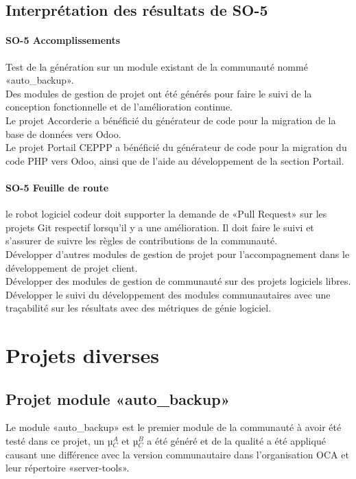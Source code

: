 \subsection{Interprétation des résultats de SO-5}

\paragraph{SO-5 Accomplissements}
Test de la génération sur un module existant de la communauté nommé «auto\_backup».\\
Des modules de gestion de projet ont été générés pour faire le suivi de la conception fonctionnelle et de l’amélioration continue.\\
Le projet Accorderie a bénéficié du générateur de code pour la migration de la base de données vers Odoo.\\
Le projet Portail CEPPP a bénéficié du générateur de code pour la migration du code PHP vers Odoo, ainsi que de l’aide au développement de la section Portail.

\paragraph{SO-5 Feuille de route}
le robot logiciel codeur doit supporter la demande de «Pull Request» sur les projets Git respectif lorsqu’il y a une amélioration. Il doit faire le suivi et s’assurer de suivre les règles de contributions de la communauté.\\
Développer d’autres modules de gestion de projet pour l’accompagnement dans le développement de projet client.\\
Développer des modules de gestion de communauté sur des projets logiciels libres.\\
Développer le suivi du développement des modules communautaires avec une traçabilité sur les résultats avec des métriques de génie logiciel.

\section{Projets diverses}

\subsection{Projet module «auto\_backup»}

Le module «auto\_backup» est le premier module de la communauté à avoir été testé dans ce projet, un µ$_C^A$ et µ$_C^B$ a été généré et de la qualité a été appliqué causant une différence avec la version communautaire dans l’organisation OCA et leur répertoire «server-tools».

